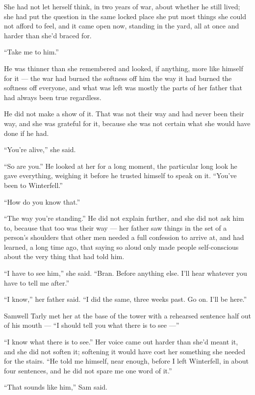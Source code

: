 She had not let herself think, in two years of war, about whether he still lived; she had put the question in the same locked place she put most things she could not afford to feel, and it came open now, standing in the yard, all at once and harder than she’d braced for.

“Take me to him.”

\sceneBreak

He was thinner than she remembered and looked, if anything, more like himself for it — the war had burned the softness off him the way it had burned the softness off everyone, and what was left was mostly the parts of her father that had always been true regardless.

He did not make a show of it. That was not their way and had never been their way, and she was grateful for it, because she was not certain what she would have done if he had.

“You’re alive,” she said.

“So are you.” He looked at her for a long moment, the particular long look he gave everything, weighing it before he trusted himself to speak on it. “You’ve been to Winterfell.”

“How do you know that.”

“The way you’re standing.” He did not explain further, and she did not ask him to, because that too was their way — her father saw things in the set of a person’s shoulders that other men needed a full confession to arrive at, and had learned, a long time ago, that saying so aloud only made people self-conscious about the very thing that had told him.

“I have to see him,” she said. “Bran. Before anything else. I’ll hear whatever you have to tell me after.”

“I know,” her father said. “I did the same, three weeks past. Go on. I’ll be here.”

\sceneBreak

Samwell Tarly met her at the base of the tower with a rehearsed sentence half out of his mouth — “I should tell you what there is to see —”

“I know what there is to see.” Her voice came out harder than she’d meant it, and she did not soften it; softening it would have cost her something she needed for the stairs. “He told me himself, near enough, before I left Winterfell, in about four sentences, and he did not spare me one word of it.”

“That sounds like him,” Sam said.


